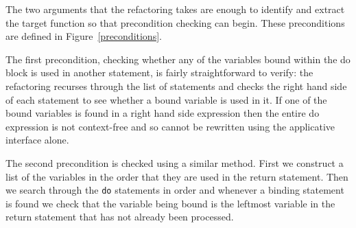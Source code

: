 The two arguments that the refactoring takes are enough to identify and extract the target function so that precondition checking can begin. These preconditions are defined in Figure~\ref{preconditions}. 

The first precondition, checking whether any of the variables bound within the do block is used in another statement, is fairly straightforward to verify: the refactoring recurses through the list of statements and checks the right hand side of each statement to see whether a bound variable is used in it. If one of the bound variables is found in a right hand side expression then the entire do expression is not context-free and so cannot be rewritten using the applicative interface alone.

The second precondition is checked using a similar method. First we construct a list of the variables in the order that they are used in the return statement. Then we search through the \texttt{do} statements in order and whenever a binding statement is found we check that the variable being bound is the leftmost variable in the return statement that has not already been processed.


